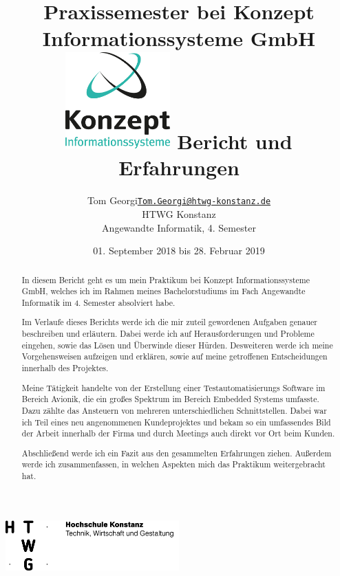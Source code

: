 \documentclass[xcolor=dvipsnames,11pt,paper=a4paper]{report}
\title{
	\Huge\textbf{Praxissemester bei Konzept Informationssysteme GmbH}\\\vspace{20pt}
	\includegraphics[width=0.3\textwidth]{graphics/konzept_logo.jpg}\break
	\huge{Bericht und Erfahrungen}
}
\author{
	\begin{tabular}{l l}
	Tom Georgi &
	\href{mailto:Tom.Georgi@htwg-konstanz.de}{\texttt{Tom.Georgi@htwg-konstanz.de}}\\
	&HTWG Konstanz\\
	&Angewandte Informatik, 4. Semester
	\end{tabular}
}
\date{01. September 2018 bis 28. Februar 2019}
\begin{document}

\begin{titlepage}
\begin{center}
\includegraphics[width=0.5\textwidth]{graphics/htwg.png}	
\end{center}
{\let\newpage\relax\maketitle}
\end{titlepage}


\begin{abstract}
In diesem Bericht geht es um mein Praktikum bei Konzept 
Informationssysteme GmbH,
welches ich im Rahmen meines Bachelorstudiums im Fach Angewandte 
Informatik im 4. Semester
absolviert habe.

Im Verlaufe dieses Berichts werde ich die mir zuteil gewordenen Aufgaben 
genauer beschreiben und erläutern. Dabei werde ich auf Herausforderungen 
und Probleme eingehen, sowie das Lösen und Überwinde dieser Hürden. 
Desweiteren werde ich meine Vorgehensweisen aufzeigen und erklären, sowie 
auf meine getroffenen Entscheidungen innerhalb des Projektes.


Meine Tätigkeit handelte von der Erstellung einer Testautomatisierungs 
Software im Bereich Avionik, die ein großes Spektrum im Bereich Embedded 
Systems umfasste. Dazu zählte das Ansteuern von mehreren 
unterschiedlichen Schnittstellen. Dabei war ich Teil eines neu 
angenommenen Kundeprojektes und bekam so ein umfassendes Bild der Arbeit 
innerhalb der Firma und durch Meetings auch direkt vor Ort beim Kunden.

Abschließend werde ich ein Fazit aus den gesammelten Erfahrungen ziehen.
Außerdem werde ich zusammenfassen, in welchen Aspekten mich das Praktikum 
weitergebracht hat.


\end{abstract}
\tableofcontents
\pagebreak

\begingroup
\let\clearpage\relax
\lstlistoflistings
\listoffigures
\pagebreak
\printbibliography
\endgroup
\end{document}
